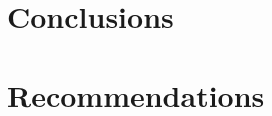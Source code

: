 \documentclass[12pt, a4paper]{article}
\begin{document}



\section{Conclusions}

\section{Recommendations}
\end{document}
